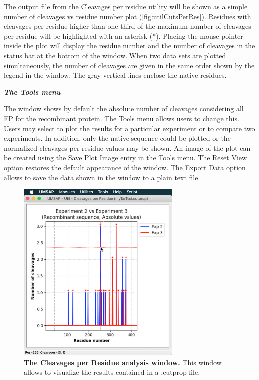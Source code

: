 The output file from the Cleavages per residue utility will be shown as a simple number of cleavages vs residue number plot (\autoref{fig:utilCutsPerRes}). Residues with cleavages per residue higher than one third of the maximum number of cleavages per residue will be highlighted with an asterisk (*). Placing the mouse pointer inside the plot will display the residue number and the number of cleavages in the status bar at the bottom of the window. When two data sets are plotted simultaneously, the number of cleavages are given in the same order shown by the legend in the window. The gray vertical lines enclose the native residues. 

\textit{\textbf{The Tools menu}}

The window shows by default the absolute number of cleavages considering all FP for the recombinant protein. The Tools menu allows users to change this. Users may select to plot the results for a particular experiment or to compare two experiments. In addition, only the native sequence could be plotted or the normalized cleavages per residue values may be shown. An image of the plot can be created using the Save Plot Image entry in the Tools menu. The Reset View option restores the default appearance of the window. The Export Data option allows to save the data shown in the window to a plain text file.  

\begin{figure}[h]
	\centering
	\includegraphics[width=0.7\textwidth]{./IMAGES/UTIL-CUTPROP-WINDOW/util-cutprop-res.jpg}	    
	\caption[The Cleavages per Residue analysis window]{\textbf{The Cleavages per Residue analysis window.} This window allows to visualize the results contained in a .cutprop file.} 
	\label{fig:utilCutsPerRes}
	\vspace{-5pt} 	
\end{figure}


